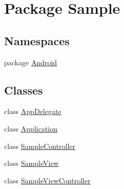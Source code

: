 \hypertarget{namespace_sample}{\section{Package Sample}
\label{namespace_sample}
}
\subsection*{Namespaces}
\begin{DoxyCompactItemize}
\item 
package \hyperlink{namespace_sample_1_1_android}{Android}
\end{DoxyCompactItemize}
\subsection*{Classes}
\begin{DoxyCompactItemize}
\item 
class \hyperlink{class_sample_1_1_app_delegate}{App\+Delegate}
\item 
class \hyperlink{class_sample_1_1_application}{Application}
\item 
class \hyperlink{class_sample_1_1_sample_controller}{Sample\+Controller}
\item 
class \hyperlink{class_sample_1_1_sample_view}{Sample\+View}
\item 
class \hyperlink{class_sample_1_1_sample_view_controller}{Sample\+View\+Controller}
\end{DoxyCompactItemize}
